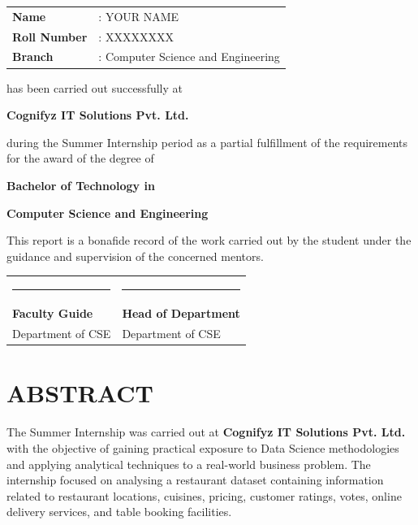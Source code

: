 \documentclass[12pt,a4paper]{report}
\begin{document}
\vspace{0.3cm}

\hspace{1.5cm}
\begin{tabular}{ll}
\textbf{Name} & : YOUR NAME \\
\textbf{Roll Number} & : XXXXXXXX \\
\textbf{Branch} & : Computer Science and Engineering \\
\end{tabular}

\vspace{0.5cm}

has been carried out successfully at

\begin{center}
{\large\bfseries Cognifyz IT Solutions Pvt. Ltd.}
\end{center}

during the Summer Internship period as a partial fulfillment of the requirements for the award of the degree of

\begin{center}
{\bfseries Bachelor of Technology in}

{\bfseries Computer Science and Engineering}
\end{center}

This report is a bonafide record of the work carried out by the student under the guidance and supervision of the concerned mentors.

\vspace{2cm}

\begin{tabular}{p{7cm}p{7cm}}
\rule{5cm}{0.4pt} & \rule{5cm}{0.4pt} \\
\textbf{Faculty Guide} & \textbf{Head of Department} \\
Department of CSE & Department of CSE \\
\end{tabular}

\newpage


\chapter*{ABSTRACT}


The Summer Internship was carried out at \textbf{Cognifyz IT Solutions Pvt. Ltd.} with the objective of gaining practical exposure to Data Science methodologies and applying analytical techniques to a real-world business problem. The internship focused on analysing a restaurant dataset containing information related to restaurant locations, cuisines, pricing, customer ratings, votes, online delivery services, and table booking facilities.
\end{document}
